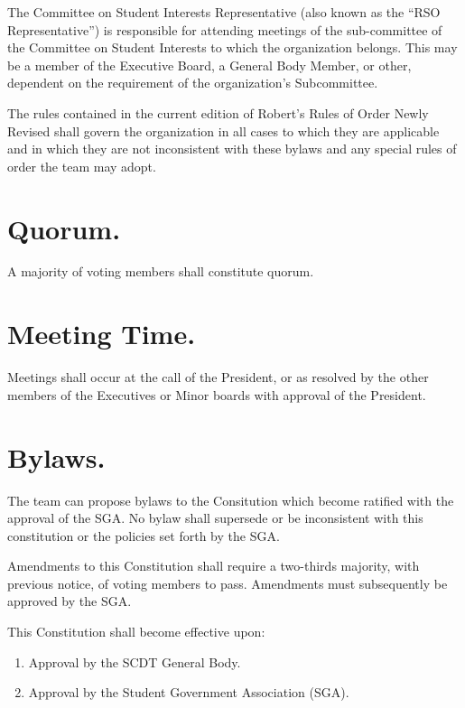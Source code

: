 \documentclass[12pt]{constitution}
\begin{document}
\label{art:COMMITTEE-ON-STUDENT-INTERESTS-REPRESENTATIVE}

The Committee on Student Interests Representative (also known as the ``RSO
Representative'') is responsible for attending meetings of the sub-committee of
the Committee on Student Interests to which the organization belongs. This may
be a member of the Executive Board, a General Body Member, or other, dependent
on the requirement of the organization’s Subcommittee.

\label{art:PARLIAMENTARY-AUTHORITY}

The rules contained in the current edition of Robert's Rules of Order Newly
Revised shall govern the organization in all cases to which they are applicable
and in which they are not inconsistent with these bylaws and any special rules
of order the team may adopt.

\label{art:MEETINGS}

\section{Quorum.}\label{sec:QUORUM}

A majority of voting members shall constitute quorum.

\section{Meeting Time.}\label{sec:MEETING-TIME}

Meetings shall occur at the call of the President, or as resolved by the other
members of the Executives or Minor boards with approval of the President.

\section{Bylaws.}\label{sec:BYLAWS}

The team can propose bylaws to the Consitution which become ratified with the
approval of the SGA. No bylaw shall supersede or be inconsistent with this
constitution or the policies set forth by the SGA.

\label{art:AMENDMENTS}

Amendments to this Constitution shall require a two-thirds majority, with
previous notice, of voting members to pass. Amendments must subsequently be
approved by the SGA. 

\label{art:ADOPTION}

This Constitution shall become effective upon: 

\begin{enumerate}
\item Approval by the SCDT General Body.
\item Approval by the Student Government Association (SGA). 
\end{enumerate}
\end{document}
